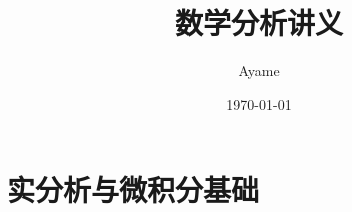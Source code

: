\documentclass[cn,12pt,math=newtx,citestyle=gb7714-2015,bibstyle=gb7714-2015]{elegantbook}
\title{数学分析讲义}
\author{Ayame}
\date{\today}
\begin{document}
    \maketitle
    \frontmatter

    
    

    \tableofcontents
    \mainmatter
    \newpage

    \part{实分析与微积分基础}
    
    
    
    
    

    \newpage
    
    
\end{document}
